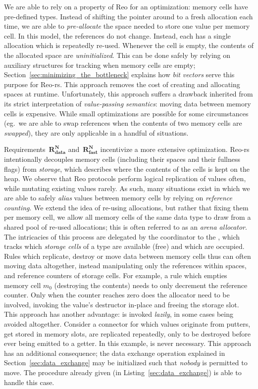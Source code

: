 We are able to rely on a property of Reo for an optimization: memory cells have pre-defined types. Instead of shifting the pointer around to a fresh allocation each time, we are able to \textit{pre-allocate} the space needed to store one value per memory cell. In this model, the references do not change. Instead, each has a single allocation which is repeatedly re-used. Whenever the cell is empty, the contents of the allocated space are \textit{uninitialized}. This can be done safely by relying on auxiliary structures for tracking when memory cells are empty; Section~\ref{sec:minimizing_the_bottleneck} explains how \textit{bit vectors} serve this purpose for Reo-rs. This approach removes the cost of creating and allocating spaces at runtime. Unfortunately, this approach suffers a drawback inherited from its strict interpretation of \textit{value-passing semantics}: moving data between memory cells is expensive. While small optimizations are possible for some circumstances (eg.\ we are able to swap references when the contents of two memory cells are \textit{swapped}), they are only applicable in a handful of situations. 

Requirements~$\boldsymbol{R^N_{data}}$ and~$\boldsymbol{R^N_{fast}}$ incentivize a more extensive optimization. Reo-rs intentionally decouples memory cells (including their spaces and their fullness flags) from \textit{storage}, which describes where the contents of the cells is kept on the heap. We observe that Reo protocols perform logical replication of values often, while mutating existing values rarely. As such, many situations exist in which we are able to safely \textit{alias} values between memory cells by relying on \textit{reference counting}. We extend the idea of re-using allocations, but rather that fixing them per memory cell, we allow all memory cells of the same data type to draw from a shared pool of re-used allocations; this is often referred to as an \textit{arena allocator}. The intricacies of this process are delegated by the coordinator to the , which tracks which \textit{storage cells} of a type are available (free) and which are occupied. Rules which replicate, destroy or move data between memory cells thus can often moving data altogether, instead manipulating only the references within spaces, and reference counters of storage cells. For example, a rule which empties memory cell $m_0$ (destroying the contents) needs to only decrement the reference counter. Only when the counter reaches zero does the allocator need to be involved, invoking the value's destructor in-place and freeing the storage slot. This approach has another advantage:  is invoked \textit{lazily}, in some cases being avoided altogether. Consider a connector for which values originate from putters, get stored in memory slots, are replicated repeatedly, only to be destroyed before ever being emitted to a getter. In this example,  is never necessary. This approach has an additional consequence; the data exchange operation explained in Section~\ref{sec:data_exchange} may be initialized such that \textit{nobody} is permitted to move. The procedure already given (in Listing~\ref{sec:data_exchange}) is able to handle this case.



